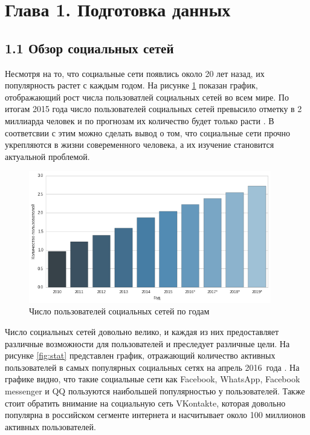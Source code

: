 \documentclass[a4paper]{report}
\begin{document}
	
	
	
	\section{Глава 1. Подготовка данных}
	\subsection{1.1 Обзор социальных сетей}
	
	
	
	Несмотря на то, что социальные сети появлись около 20 лет назад, их популярность растет с каждым годом. На рисунке \ref{fig:popularity}  показан график, отображающий рост числа пользоватлей социальных сетей во всем мире. По итогам 2015 года число пользователей социальных сетей превысило отметку в 2 миллиарда человек и по прогнозам их количество будет только расти \cite{bib:Popularity}. В соответсвии с этим можно сделать вывод о том, что социальные сети прочно укрепляются в жизни совеременного человека, а их изучение становится актуальной проблемой.
	\newline
	\newline
	\begin{figure}[h]
		
		\centering
		\includegraphics[width=400px]
		{imgs/Popularity.png}
		\caption{Число пользователей социальных сетей по годам}
		\label{fig:popularity}
	\end{figure}
	\newline			
	\newline
	
	
	
	Число социальных сетей довольно велико, и каждая из них предоставляет различные возможности для пользователей и преследует различные цели.  На рисунке \ref{fig:stat} представлен график, отражающий количество активных пользователей в самых популярных социальных сетях на апрель 2016~года  \cite{bib:PopularNetwork}. На графике видно, что такие социальные сети как Facebook, WhatsApp, Facebook messenger и QQ пользуются наибольшей популярностью у пользователей. 	
	Также стоит обратить внимание на социальную сеть VKontakte, которая довольно популярна в российском сегменте интернета и насчитывает около 100 миллионов активных пользователей.
	
\end{document}
